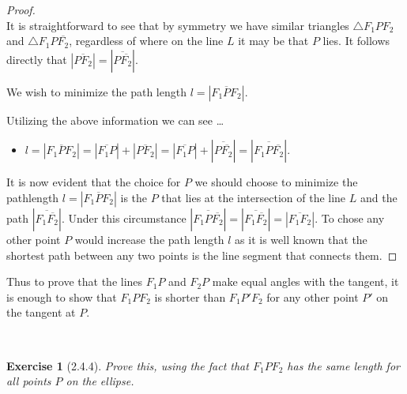 \documentclass[12pt]{article}
\newcommand{\XB}{\color{black}}
\newcommand{\XBB}{\color{blue}}
\newcommand{\ds}{\displaystyle}
\theoremstyle{plain}
\newtheorem{ex}{Exercise}
\begin{document}
\begin{proof}
  \ \\

  It is straightforward to see that by symmetry we have similar triangles $ \triangle F_{1}PF_{2} $ and $ \triangle F_{1}P\overline{F_2} $, regardless of where on the line $ L $ it may be that $ P $ lies.
  It follows directly that $ \ds | \overline{PF_{2}} | = | \overline{P\overline{F_2}} | $.

  We wish to minimize the path length $ l = | \overline{F_{1}PF_{2}} | $.

  Utilizing the above information we can see \dots

  \begin{itemize}
    \item $ l = | \overline{F_{1}PF_{2}} | = | \overline{F_{1}P} | + | \overline{PF_{2}} | = | \overline{F_{1}P} | + | \overline{P\overline{F_2}} | = | \overline{F_{1}P\overline{F_2}} | $.
  \end{itemize}

  It is now evident that the choice for $ P $ we should choose to minimize the pathlength $ l = | \overline{F_{1}PF_{2}} | $ is the $ P $ that lies at the intersection of the line $ L $ and the path $ | \overline{F_{1}\overline{F_2}} | $.
  Under this circumstance $ | \overline{F_{1}P\overline{F_2}} | = | \overline{F_{1}\overline{F_2}} | = | \overline{F_{1}F_2} | $.
  To chose any other point $ P $ would increase the path length $ l $ as it is well known that the shortest path between any two points is the line segment that connects them.

\end{proof}

\vfill

Thus to prove that the lines $F_1P$ and $F_2P$ make equal angles with the tangent, it is enough to show that $F_1PF_2$ is shorter than $F_1P'F_2$ for any other point $P'$ on the tangent at $P$.

\newpage
\XBB\hrulefill\XB \\
\begin{ex} [2.4.4]
  Prove this, using the fact that $F_1PF_2$ has the same length for all points $P$ on the ellipse.
\end{ex}
\XBB\hrulefill\XB \\
\end{document}
